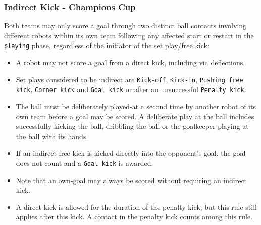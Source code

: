 \subsubsection{Indirect Kick - Champions Cup}
\label{sec:indirect_kick_champions}

Both teams may only score a goal through two distinct ball contacts involving different robots within its own team following any affected start or restart in the \texttt{playing} phase, regardless of the initiator of the set play/free kick:

\begin{itemize}
  \item A robot may not score a goal from a direct kick, including via deflections.
  \item Set plays considered to be indirect are \texttt{Kick-off}, \texttt{Kick-in}, \texttt{Pushing free kick}, \texttt{Corner kick} and \texttt{Goal kick} or after an unsuccessful \texttt{Penalty kick}.
  \item The ball must be deliberately played-at a second time by another robot of its own team before a goal may be scored.
    A deliberate play at the ball includes successfully kicking the ball, dribbling the ball or the goalkeeper playing at the ball with its hands.
  \item If an indirect free kick is kicked directly into the opponent's goal, the goal does not count and a \texttt{Goal kick} is awarded.
  \item Note that an own-goal may always be scored without requiring an indirect kick.
  \item A direct kick is allowed for the duration of the penalty kick, but this rule still applies after this kick. A contact in the penalty kick counts among this rule.
\end{itemize}

